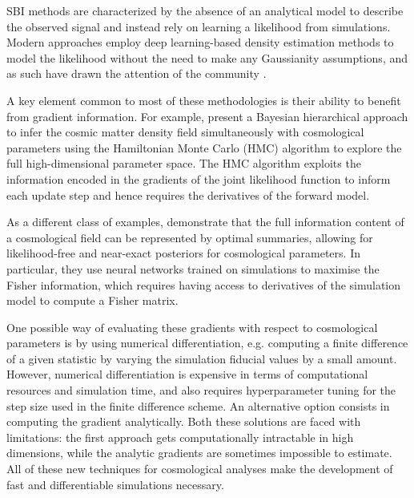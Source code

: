 \documentclass{aa}
\begin{document}
SBI methods are characterized by the absence of an analytical model to describe the observed signal and instead rely on learning a likelihood from simulations. Modern approaches employ deep learning-based density estimation methods to model the likelihood without the need to make any Gaussianity assumptions, and as such have 
drawn the attention of the community \citep{alsing2018massive, jeffrey2021likelihood}.  

A key element common to most of these methodologies is their ability to benefit from gradient information. 
For example, \cite{porqueres2021bayesian} present a Bayesian hierarchical approach to infer the cosmic matter density field simultaneously with cosmological parameters using the Hamiltonian Monte Carlo (HMC) algorithm to explore the full high-dimensional parameter space. The HMC algorithm exploits the information encoded in the gradients of the joint likelihood function to inform each update step and hence requires the derivatives of the forward model. 

 As a different class of examples, \cite{makinen2021lossless} demonstrate that the full information content of a cosmological field can be represented by optimal summaries, allowing for likelihood-free and near-exact posteriors for cosmological parameters. In particular, they use neural networks trained on simulations to maximise the Fisher information, which requires having access to derivatives of the simulation model to compute a Fisher matrix.  

One possible way of evaluating these gradients with respect to cosmological parameters is by using numerical differentiation, e.g. computing a finite difference of a given statistic by varying the simulation fiducial values by a small amount.
However, numerical differentiation is expensive in terms of computational resources and simulation time, and also requires hyperparameter tuning for the step size used in the finite difference scheme. An alternative option consists in computing the gradient analytically. Both these solutions are faced with limitations: the first approach gets computationally intractable in high dimensions, while the analytic gradients are sometimes impossible to estimate.
All of these new techniques for cosmological analyses make the development of fast and differentiable simulations necessary.
\end{document}
